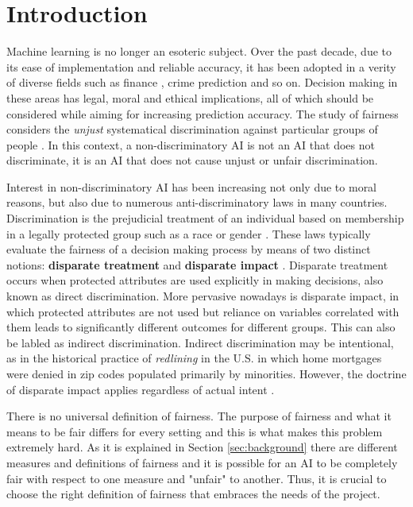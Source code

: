 \section{Introduction} \label{sec:intro}
Machine learning is no longer an esoteric subject. Over the past decade, due to its ease of implementation and reliable accuracy, it has been adopted in a verity of diverse fields such as finance  \cite{huang2007credit, tsai2008using, galindo2000credit}, crime prediction \cite{brennan2009evaluating} and so on. Decision making in these areas has legal, moral and ethical implications, all of which should be considered while aiming for increasing prediction accuracy. The study of fairness considers the \textit{unjust} systematical discrimination against particular groups of people \cite{angwin2016machine, chouldechova2017fair, barocas2016big, berk2017fairness}. In this context, a non-discriminatory AI is not an AI that does not discriminate, it is an AI that does not cause unjust or unfair discrimination.

Interest in non-discriminatory AI has been increasing not only due to moral reasons, but also due to numerous anti-discriminatory laws in many countries. Discrimination is the prejudicial treatment of an individual based on membership in a legally protected group such as a race or gender \cite{calmon2017optimized}. These laws typically evaluate the fairness of a decision making process by means of two distinct notions: \textbf{disparate treatment} and \textbf{disparate impact} \cite{zafar2017fairness}. Disparate treatment occurs when protected attributes are used explicitly in making decisions, also known as direct discrimination. More pervasive nowadays is disparate impact, in which protected attributes are not used but reliance on variables correlated with them leads to significantly different outcomes for different groups. This can also be labled as indirect discrimination. Indirect discrimination may be intentional, as in the historical practice of \textit{redlining} in the U.S. in which home mortgages were denied in zip codes populated primarily by minorities. However, the doctrine of disparate impact applies regardless of actual intent \cite{calmon2017optimized}.

There is no universal definition of fairness. The purpose of fairness and what it means to be fair differs for every setting and this is what makes this problem extremely hard. As it is explained in Section \ref{sec:background} there are different measures and definitions of fairness and it is possible for an AI to be completely fair with respect to one measure and "unfair" to another. Thus, it is crucial to choose the right definition of fairness that embraces the needs of the project.

